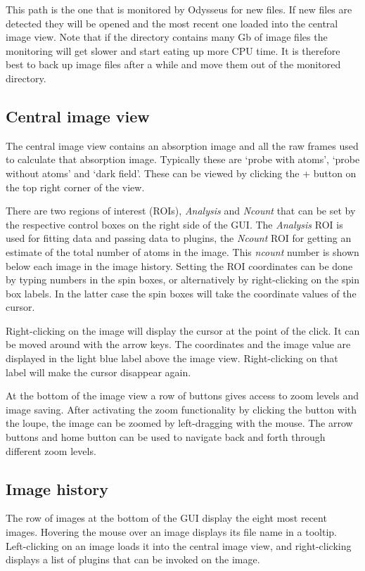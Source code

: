\documentclass[letterpaper,10pt,english]{manual}
\begin{document}
This path is the one that is monitored by Odysseus for new files. If new files are detected they will be opened and the most recent one loaded into the central image view. Note that if the directory contains many Gb of image files the monitoring will get slower and start eating up more CPU time. It is therefore best to back up image files after a while and move them out of the monitored directory.


\subsection{Central image view}

The central image view contains an absorption image and all the raw frames used to calculate that absorption image. Typically these are `probe with atoms', `probe without atoms' and `dark field'. These can be viewed by clicking the + button on the top right corner of the view.

There are two regions of interest (ROIs), \emph{Analysis} and \emph{Ncount} that can be set by the respective control boxes on the right side of the GUI. The \emph{Analysis} ROI is used for fitting data and passing data to plugins, the \emph{Ncount} ROI for getting an estimate of the total number of atoms in the image. This \emph{ncount} number is shown below each image in the image history. Setting the ROI coordinates can be done by typing numbers in the spin boxes, or alternatively by right-clicking on the spin box labels. In the latter case the spin boxes will take the coordinate values of the cursor.

Right-clicking on the image will display the cursor at the point of the click. It can be moved around with the arrow keys. The coordinates and the image value are displayed in the light blue label above the image view. Right-clicking on that label will make the cursor disappear again.

At the bottom of the image view a row of buttons gives access to zoom levels and image saving. After activating the zoom functionality by clicking the button with the loupe, the image can be zoomed by left-dragging with the mouse. The arrow buttons and home button can be used to navigate back and forth through different zoom levels.


\subsection{Image history}

The row of images at the bottom of the GUI display the eight most recent images. Hovering the mouse over an image displays its file name in a tooltip. Left-clicking on an image loads it into the central image view, and right-clicking displays a list of plugins that can be invoked on the image.
\end{document}
